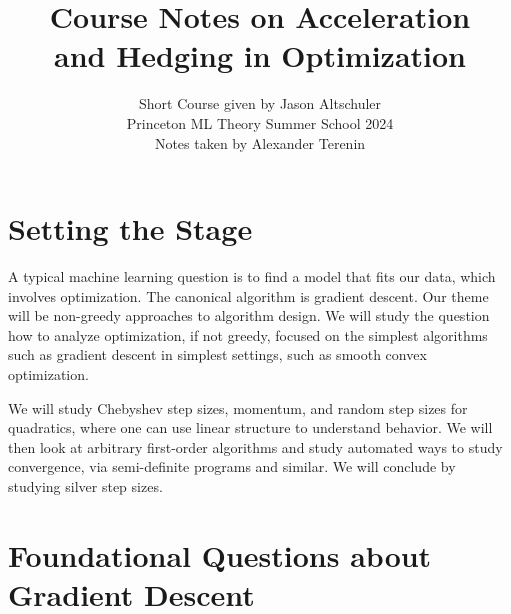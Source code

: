 \documentclass{article}
\title{Course Notes on Acceleration\\and Hedging in Optimization}
\author{Short Course given by Jason Altschuler\\[1ex]Princeton ML Theory Summer School 2024\\[1ex]Notes taken by Alexander Terenin}
\begin{document}
\maketitle

\section{Setting the Stage}

A typical machine learning question is to find a model that fits our data, which involves optimization.
The canonical algorithm is gradient descent.
Our theme will be non-greedy approaches to algorithm design.
We will study the question how to analyze optimization, if not greedy, focused on the simplest algorithms such as gradient descent in simplest settings, such as smooth convex optimization.

We will study Chebyshev step sizes, momentum, and random step sizes for quadratics, where one can use linear structure to understand behavior.
We will then look at arbitrary first-order algorithms and study automated ways to study convergence, via semi-definite programs and similar.
We will conclude by studying silver step sizes.

\section{Foundational Questions about Gradient Descent}
\end{document}
